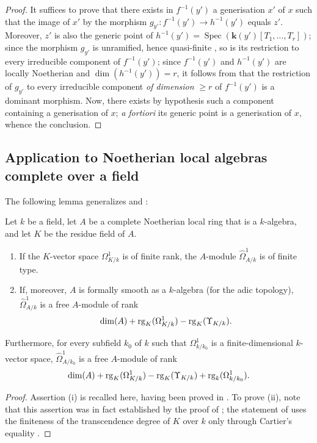 \begin{proof}
It suffices to prove that there exists in $f^{-1}(y')$ a generisation $x'$ of $x$ such that the image of $x'$ by the morphism $g_{y'}:f^{-1}(y')\to h^{-1}(y')$ equals $z'$.
Moreover, $z'$ is also the generic point of $h^{-1}(y')=\operatorname{Spec}(\boldsymbol{k}(y')[T_1,\ldots,T_r])$; since the morphism $g_{y'}$ is unramified, hence quasi-finite , so is its restriction to every irreducible component of $f^{-1}(y')$; since $f^{-1}(y')$ and $h^{-1}(y')$ are locally Noetherian and $\dim(h^{-1}(y'))=r$, it follows from  that the restriction of $g_{y'}$ to every irreducible component \emph{of dimension} $\geq r$ of $f^{-1}(y')$ is a dominant morphism.
Now, there exists by hypothesis such a component containing a generisation of $x$; \emph{a fortiori} its generic point is a generisation of $x$, whence the conclusion.
\end{proof}

\subsection{Application to Noetherian local algebras complete over a field}
\label{subsection:IV.18.11}

The following lemma generalizes  and :

\begin{lemma}[18.11.1]
\label{IV.18.11.1}
Let $k$ be a field, let $A$ be a complete Noetherian local ring that is a $k$-algebra, and let $K$ be the residue field of $A$.
\begin{enumerate}[label=\textup{(\roman*)}]
  \item If the $K$-vector space $\Omega^1_{K/k}$ is of finite rank, the $A$-module $\hat{\Omega}^1_{A/k}$ is of finite type.
  \item If, moreover, $A$ is formally smooth as a $k$-algebra (for the adic topology), $\hat{\Omega}^1_{A/k}$ is a free $A$-module of rank
\[
  \dim(A)+\operatorname{rg}_{K}(\Omega^1_{K/k})-\operatorname{rg}_{K}(\Upsilon_{K/k}).
\]
\end{enumerate}
Furthermore, for every subfield $k_0$ of $k$ such that $\Omega^1_{k/k_0}$ is a finite-dimensional $k$-vector space, $\hat{\Omega}^1_{A/k_0}$ is a free $A$-module of rank
\[
  \dim(A)+\operatorname{rg}_{K}(\Omega^1_{K/k})-\operatorname{rg}_{K}(\Upsilon_{K/k})+\operatorname{rg}_{k}(\Omega^1_{k/k_0}).
\]
\end{lemma}

\begin{proof}
Assertion (i) is recalled here, having been proved in .
To prove (ii), note that this assertion was in fact established by the proof of ; the statement of  uses the finiteness of the transcendence degree of $K$ over $k$ only through Cartier's equality .
\end{proof}

